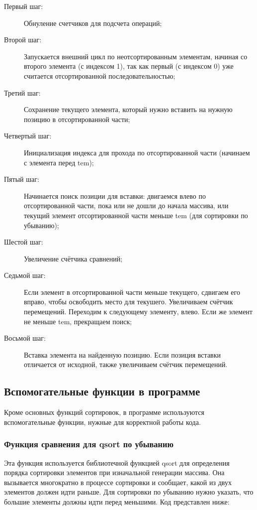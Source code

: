 \documentclass[a4paper,12pt,titlepage,finall]{article}
\begin{document}
\begin{description}
\item[Первый шаг:] Обнуление счетчиков для подсчета операций;

\item[Второй шаг:] Запускается внешний цикл по неотсортированным элементам, начиная со второго элемента (с индексом 1), так как первый (с индексом 0) уже считается отсортированной последовательностью;

\item[Третий шаг:] Сохранение текущего элемента, который нужно вставить на нужную позицию в отсортированной части;

\item[Четвертый шаг:] Инициализация индекса для прохода по отсортированной части (начинаем с элемента перед tem);

\item[Пятый шаг:] Начинается поиск позиции для вставки: двигаемся влево по отсортированной части, пока или не дошли до начала массива, или текущий элемент отсортированной части меньше tem (для сортировки по убыванию);

\item[Шестой шаг:] Увеличение счётчика сравнений;

\item[Седьмой шаг:] Если элемент в отсортированной части меньше текущего, сдвигаем его вправо, чтобы освободить место для текушего. Увеличиваем счётчик перемещений. Переходим к следующему элементу, влево. Если же элемент не меньше tem, прекращаем поиск;

\item[Восьмой шаг:] Вставка элемента на найденную позицию. Если позиция вставки отличается от исходной, также увеличиваем счётчик перемещений.

\end{description}

\subsection{Вспомогательные функции в программе}
Кроме основных функций сортировок, в программе используются вспомогательные функции, нужные для корректной работы кода.
\subsubsection{Функция сравнения для qsort по убыванию}
Эта функция используется библиотечной функцией qsort для определения порядка сортировки элементов при изначальной генерации массива. Она вызывается многократно в процессе сортировки и сообщает, какой из двух элементов должен идти раньше. Для сортировки по убыванию нужно указать, что большие элементы должны идти перед меньшими.
Код представлен ниже:
\end{document}
